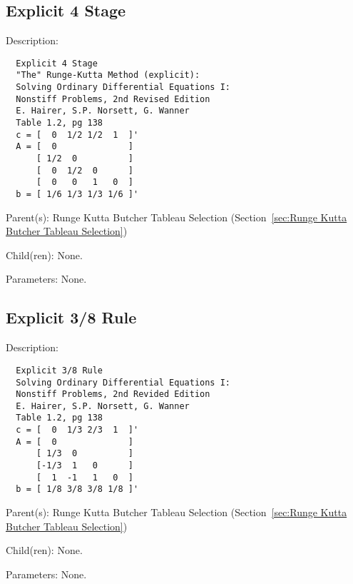 \subsection{Explicit 4 Stage}
\label{sec:Explicit 4 Stage}

\begin{list}{}
  {\setlength{\leftmargin}{1.0in}
   \setlength{\labelwidth}{0.75in}
   \setlength{\labelsep}{0.125in}}
  \item[Description:]
\begin{verbatim}
  Explicit 4 Stage
  "The" Runge-Kutta Method (explicit):
  Solving Ordinary Differential Equations I:
  Nonstiff Problems, 2nd Revised Edition
  E. Hairer, S.P. Norsett, G. Wanner
  Table 1.2, pg 138
  c = [  0  1/2 1/2  1  ]'
  A = [  0              ]
      [ 1/2  0          ]
      [  0  1/2  0      ]
      [  0   0   1   0  ]
  b = [ 1/6 1/3 1/3 1/6 ]'
\end{verbatim}
  \item[Parent(s):]
    Runge Kutta Butcher Tableau Selection (Section~\ref{sec:Runge Kutta Butcher Tableau Selection})
  \item[Child(ren):]
    None. 
  \item[Parameters:]
    None. 
\end{list}

\subsection{Explicit 3/8 Rule}
\label{sec:Explicit 3/8 Rule}

\begin{list}{}
  {\setlength{\leftmargin}{1.0in}
   \setlength{\labelwidth}{0.75in}
   \setlength{\labelsep}{0.125in}}
  \item[Description:]
\begin{verbatim}
  Explicit 3/8 Rule
  Solving Ordinary Differential Equations I:
  Nonstiff Problems, 2nd Revided Edition
  E. Hairer, S.P. Norsett, G. Wanner
  Table 1.2, pg 138
  c = [  0  1/3 2/3  1  ]'
  A = [  0              ]
      [ 1/3  0          ]
      [-1/3  1   0      ]
      [  1  -1   1   0  ]
  b = [ 1/8 3/8 3/8 1/8 ]'
\end{verbatim}
  \item[Parent(s):]
    Runge Kutta Butcher Tableau Selection (Section~\ref{sec:Runge Kutta Butcher Tableau Selection})
  \item[Child(ren):]
    None. 
  \item[Parameters:]
    None. 
\end{list}

